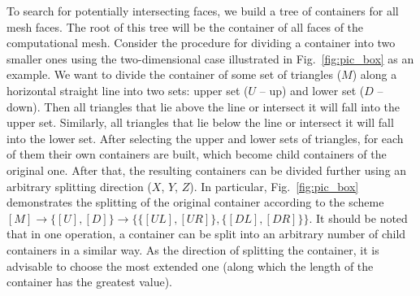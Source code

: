 \documentclass[
11pt,%
tightenlines,%
twoside,%
onecolumn,%
nofloats,%
nobibnotes,%
nofootinbib,%
superscriptaddress,%
noshowpacs,%
centertags]%
{revtex4-2}
\begin{document}
To search for potentially intersecting faces, we build a tree of containers for all mesh faces.
The root of this tree will be the container of all faces of the computational mesh.
Consider the procedure for dividing a container into two smaller ones using the two-dimensional case illustrated in Fig.~\ref{fig:pic_box} as an example.
We want to divide the container of some set of triangles ($M$) along a horizontal straight line into two sets: upper set ($U$ -- up) and lower set ($D$ -- down).
Then all triangles that lie above the line or intersect it will fall into the upper set.
Similarly, all triangles that lie below the line or intersect it will fall into the lower set.
After selecting the upper and lower sets of triangles, for each of them their own containers are built, which become child containers of the original one.
After that, the resulting containers can be divided further using an arbitrary splitting direction ($X$, $Y$, $Z$).
In particular, Fig.~\ref{fig:pic_box} demonstrates the splitting of the original container according to the scheme $[M] \rightarrow \{[U], [D]\} \rightarrow \{\{[UL], [UR]\}, \{[DL], [DR]\}\}$.
It should be noted that in one operation, a container can be split into an arbitrary number of child containers in a similar way.
As the direction of splitting the container, it is advisable to choose the most extended one (along which the length of the container has the greatest value).
\end{document}
